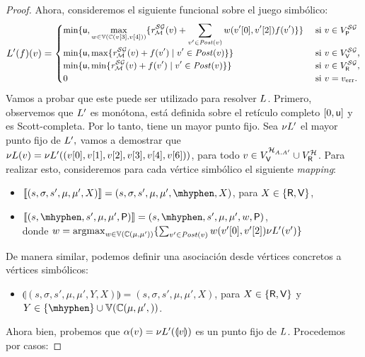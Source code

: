 \begin{proof}
    Ahora, consideremos el siguiente funcional sobre el juego simbólico:
\[\small
\Bellman'(f)(v) =
    \begin{cases}
           \displaystyle \min \{ \upperbound, \max_{w \in \vertices{\couplings{\pr{3}{v}}{\pr{4}{v}}}} \{\mreward^\SymbG(v)  + \sum_{v' \in \post(v)} w(\pr{0}{v'},\pr{2}{v'})  f(v') \} \}& \text{ si }v \in V^{\SymbG}_\Probabilistic  \\
           \displaystyle \min \{ \upperbound, \max \{\mreward^\SymbG(v)  +f(v') \mid v' \in \post(v) \} \} & \text{ si } v \in  V^{\SymbG}_\Verifier, \\
           \displaystyle \min \{ \upperbound, \min \{\mreward^\SymbG(v) + f(v') \mid v' \in \post(v) \} \} & \text{ si } v \in  V^{\SymbG}_\Refuter, \\
           \displaystyle 0 & \text{ si } v=\ErrorSt.
           \displaystyle 
    \end{cases}
\]
Vamos a probar que este puede ser utilizado para resolver $\Bellman$. Primero, observemos que $\Bellman'$ es monótona,  está definida sobre el retículo completo $[0,\upperbound]$ y es Scott-completa. Por lo tanto, tiene un mayor punto fijo.  Sea $\nu \Bellman'$ el mayor punto fijo de $\Bellman',$  vamos a demostrar que
$\nu \Bellman(v) = \nu \Bellman'((v[0],v[1],v[2],v[3],v[4], v[6]))$, para todo $v \in V^{\mathcal{H}_{A,A'}}_\Verifier \cup V^{\mathcal{H}}_\Refuter$.
Para realizar esto, consideremos para cada vértice simbólico el siguiente \emph{mapping}:
\begin{itemize}
    \item $\llbracket (s,\sigma,s',\mu,\mu',X) \rrbracket = (s,\sigma,s',\mu,\mu',\mhyphen,X)$, para $X \in \{\Refuter, \Verifier\}$,
    \item $\llbracket (s,\mhyphen, s',\mu,\mu',\Probabilistic) \rrbracket =(s, \mhyphen,s', \mu,\mu', w,\Probabilistic)$,  \\ donde
              $w = \argmax_{w \in \vertices{\couplings{\mu}{\mu'}}} \{\sum_{v' \in \post(v)} w(\pr{0}{v'},\pr{2}{v'})  \nu \Bellman'(v') \}$
\end{itemize}
    De manera similar, podemos definir una asociación desde vértices concretos a vértices simbólicos:
\begin{itemize}
    \item $\llparenthesis (s,\sigma,s',\mu,\mu',Y ,X) \rrparenthesis = (s,\sigma,s',\mu,\mu',X)$, para $X \in \{\Refuter, \Verifier \}$ y $Y \in \{\mhyphen \} \cup \vertices{\couplings{\mu,\mu'}}$.
\end{itemize}
    Ahora bien, probemos que $\alpha(v) = \nu \Bellman'(\llparenthesis v \rrparenthesis)$ es un punto fijo de $\Bellman$. Procedemos por casos:
   

\end{proof}
